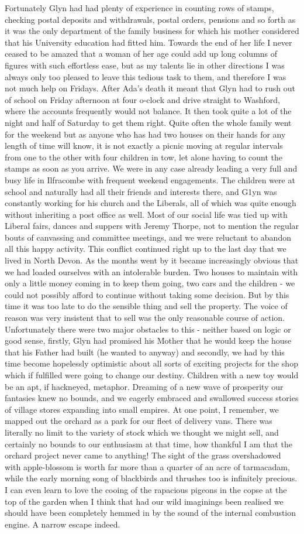 Fortunately Glyn had had plenty of experience in counting rows of stamps, checking postal deposits and withdrawals, postal orders, pensions and so forth as it was the only department of the family business for which his mother considered that his University education had fitted him. Towards the end of her life I never ceased to be amazed that a woman of her age could add up long columns of figures with such effortless ease, but as my talents lie in other directions I was always only too pleased to leave this tedious task to them, and therefore I was not much help on Fridays. After Ada's death it meant that Glyn had to rush out of school on Friday afternoon at four o-clock and drive straight to Washford, where the accounts frequently would not balance. It then took quite a lot of the night and half of Saturday to get them right. Quite often the whole family went for the weekend but as anyone who has had two houses on their hands for any length of time will know, it is not exactly a picnic moving at regular intervals from one to the other with four children in tow, let alone having to count the stamps as soon as you arrive. We were in any case already leading a very full and busy life in Ilfracombe with frequent weekend engagements. The children were at school and naturally had all their friends and interests there, and G1yn was constantly working for his church and the Liberals, all of which was quite enough without inheriting a post office as well. Most of our social life was tied up with Liberal fairs, dances and suppers with Jeremy Thorpe, not to mention the regular bouts of canvassing and committee meetings, and we were reluctant to abandon all this happy activity. This conflict continued right up to the last day that we lived in North Devon. As the months went by it became increasingly obvious that we had loaded ourselves with an intolerable burden. Two houses to maintain with only a little money coming in to keep them going, two cars and the children - we could not possibly afford to continue without taking some decision. But by this time it was too late to do the sensible thing and sell the property. The voice of reason was very insistent that to sell was the only reasonable course of action. Unfortunately there were two major obstacles to this - neither based on logic or good sense, firstly, Glyn had promised his Mother that he would keep the house that his Father had built (he wanted to anyway) and secondly, we had by this time become hopelessly optimistic about all sorts of exciting projects for the shop which if fulfilled were going to change our destiny. Children with a new toy would be an apt, if hackneyed, metaphor. Dreaming of a new wave of prosperity our fantasies knew no bounds, and we eagerly embraced and swallowed success stories of village stores expanding into small empires. At one point, I remember, we mapped out the orchard as a park for our fleet of delivery vans. There was literally no limit to the variety of stock which we thought we might sell, and certainly no bounds to our enthusiasm at that time, how thankful I am that the orchard project never came to anything! The sight of the grass overshadowed with apple-blossom is worth far more than a quarter of an acre of tarmacadam, while the early morning song of blackbirds and thrushes too is infinitely precious. I can even learn to love the cooing of the rapacious pigeons in the copse at the top of the garden when I think that had our wild imaginings been realised we should have been completely hemmed in by the sound of the internal combustion engine. A narrow escape indeed.